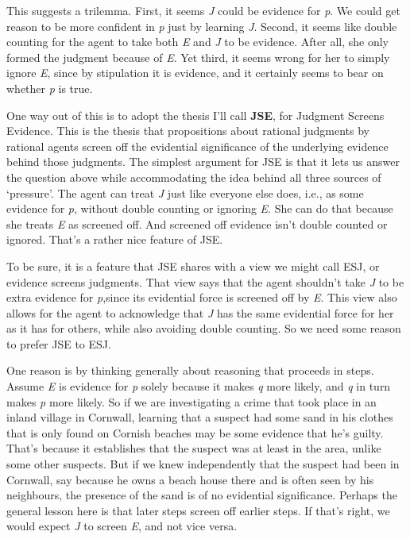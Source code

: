 \documentclass[
  10pt,
  letterpaper,
  twoside]{scrbook}
\begin{document}
This suggests a trilemma. First, it seems \emph{J} could be evidence for
\emph{p}. We could get reason to be more confident in \emph{p} just by
learning \emph{J}. Second, it seems like double counting for the agent
to take both \emph{E} and \emph{J} to be evidence. After all, she only
formed the judgment because of \emph{E}. Yet third, it seems wrong for
her to simply ignore \emph{E}, since by stipulation it is evidence, and
it certainly seems to bear on whether \emph{p} is true.

One way out of this is to adopt the thesis I'll call \textbf{JSE}, for
Judgment Screens Evidence. This is the thesis that propositions about
rational judgments by rational agents screen off the evidential
significance of the underlying evidence behind those judgments. The
simplest argument for JSE is that it lets us answer the question above
while accommodating the idea behind all three sources of `pressure'. The
agent can treat \emph{J} just like everyone else does, i.e., as some
evidence for \emph{p}, without double counting or ignoring \emph{E}. She
can do that because she treats \emph{E} as screened off. And screened
off evidence isn't double counted or ignored. That's a rather nice
feature of JSE.

To be sure, it is a feature that JSE shares with a view we might call
ESJ, or evidence screens judgments. That view says that the agent
shouldn't take \emph{J} to be extra evidence for \emph{p},since its
evidential force is screened off by \emph{E}. This view also allows for
the agent to acknowledge that \emph{J} has the same evidential force for
her as it has for others, while also avoiding double counting. So we
need some reason to prefer JSE to ESJ.

One reason is by thinking generally about reasoning that proceeds in
steps. Assume \emph{E} is evidence for \emph{p} solely because it makes
\emph{q} more likely, and \emph{q} in turn makes \emph{p} more likely.
So if we are investigating a crime that took place in an inland village
in Cornwall, learning that a suspect had some sand in his clothes that
is only found on Cornish beaches may be some evidence that he's guilty.
That's because it establishes that the suspect was at least in the area,
unlike some other suspects. But if we knew independently that the
suspect had been in Cornwall, say because he owns a beach house there
and is often seen by his neighbours, the presence of the sand is of no
evidential significance. Perhaps the general lesson here is that later
steps screen off earlier steps. If that's right, we would expect
\emph{J} to screen \emph{E}, and not vice versa.
\end{document}
